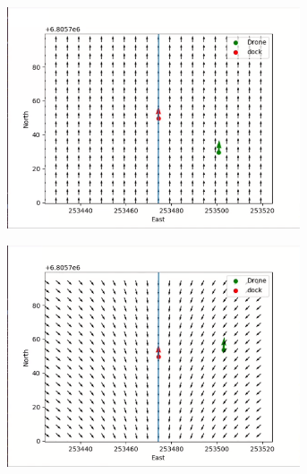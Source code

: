\documentclass[12pt]{report}
\begin{document}
\begin{figure}[H]
  \centering
  \begin{subfigure}{0.45\textwidth}
    \centering
    \includegraphics[width=0.95\textwidth]{imgs/drone_exp1_1.png}
    \caption{}
  \end{subfigure}
  \begin{subfigure}{0.45\textwidth}
    \centering
    \includegraphics[width=0.95\textwidth]{imgs/drone_exp1_2.png}
    \caption{}
  \end{subfigure}


\end{figure}
\end{document}
